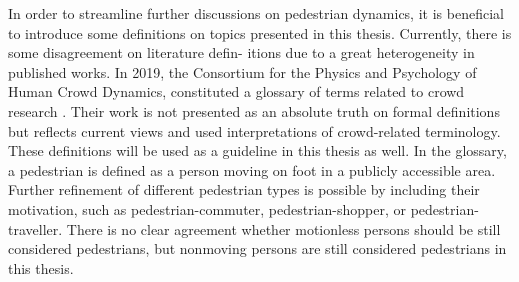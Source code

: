 \documentclass[class=article, crop=false]{standalone}
\begin{document}
In order to streamline further discussions on pedestrian dynamics, it is beneficial to introduce some definitions on topics presented in this thesis. Currently, there is some disagreement on literature defin- itions due to a great heterogeneity in published works. In 2019, the Consortium for the Physics and Psychology of Human Crowd Dynamics, constituted a glossary of terms related to crowd research \cite{glossary_for_pedestrian}. Their work is not presented as an absolute truth on formal definitions but reflects current views and used interpretations of crowd-related terminology. These definitions will be used as a guideline in this thesis as well. In the glossary, a pedestrian is defined as a person moving on foot in a publicly accessible area. Further refinement of different pedestrian types is possible by including their motivation, such as pedestrian-commuter, pedestrian-shopper, or pedestrian-traveller. There is no clear agreement whether motionless persons should be still considered pedestrians, but nonmoving persons are still considered pedestrians in this thesis.
\end{document}
